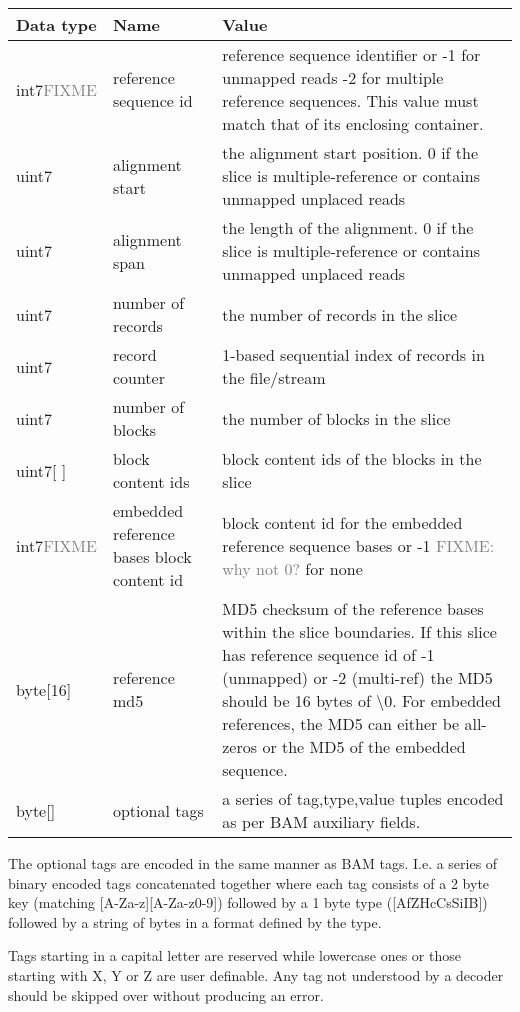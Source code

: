 \documentclass[a4paper]{article}
\begin{document}
\begin{tabular}{|l|l|>{\raggedright}p{200pt}|}
\hline
\textbf{Data type} & \textbf{Name} & \textbf{Value}\tabularnewline
\hline
int7\textcolor{gray}{FIXME} & reference sequence id & reference sequence identifier or\linebreak{}
-1 for unmapped reads\linebreak{}
-2 for multiple reference sequences.\linebreak{}
This value must match that of its enclosing container.\tabularnewline
\hline
uint7 & alignment start & the alignment start position.\linebreak{}
0 if the slice is multiple-reference
or contains unmapped unplaced reads\tabularnewline
\hline
uint7 & alignment span & the length of the alignment.\linebreak{}
0 if the slice is multiple-reference
or contains unmapped unplaced reads\tabularnewline
\hline
uint7 & number of records & the number of records in the slice\tabularnewline
\hline
uint7 & record counter & 1-based sequential index of records in the file/stream\tabularnewline
\hline
uint7 & number of blocks & the number of blocks in the slice\tabularnewline
\hline
uint7[ ] & block content ids & block content ids of the blocks in the slice\tabularnewline
\hline
int7\textcolor{gray}{FIXME} & embedded reference bases block content id & block content id for the embedded 
reference sequence bases or -1 \textcolor{gray}{FIXME: why not 0?} for none\tabularnewline
\hline
byte[16] & reference md5 & MD5 checksum of the reference bases within the slice 
boundaries.  If this slice has reference sequence id of -1 (unmapped) or -2 (multi-ref)
the MD5 should be 16 bytes of \textbackslash{}0. For embedded references, the MD5
can either be all-zeros or the MD5 of the embedded sequence.\tabularnewline
\hline
byte[] & optional tags & a series of tag,type,value tuples encoded as
per BAM auxiliary fields.\tabularnewline
\hline
\end{tabular}

The optional tags are encoded in the same manner as BAM tags.  I.e. a
series of binary encoded tags concatenated together where each tag
consists of a 2 byte key (matching [A-Za-z][A-Za-z0-9]) followed by a
1 byte type ([AfZHcCsSiIB]) followed by a string of bytes in a format
defined by the type.

Tags starting in a capital letter are reserved while lowercase ones or
those starting with X, Y or Z are user definable.  Any tag not
understood by a decoder should be skipped over without producing an
error.
\end{document}
